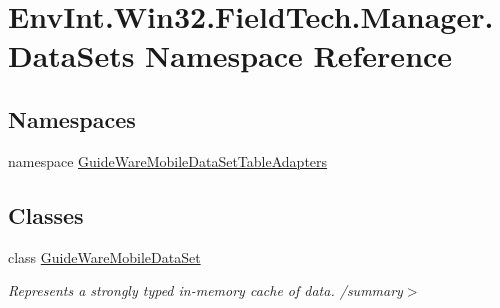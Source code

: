 \hypertarget{namespace_env_int_1_1_win32_1_1_field_tech_1_1_manager_1_1_data_sets}{}\section{Env\+Int.\+Win32.\+Field\+Tech.\+Manager.\+Data\+Sets Namespace Reference}
\label{namespace_env_int_1_1_win32_1_1_field_tech_1_1_manager_1_1_data_sets}
\subsection*{Namespaces}
\begin{DoxyCompactItemize}
\item 
namespace \hyperlink{namespace_env_int_1_1_win32_1_1_field_tech_1_1_manager_1_1_data_sets_1_1_guide_ware_mobile_data_set_table_adapters}{Guide\+Ware\+Mobile\+Data\+Set\+Table\+Adapters}
\end{DoxyCompactItemize}
\subsection*{Classes}
\begin{DoxyCompactItemize}
\item 
class \hyperlink{class_env_int_1_1_win32_1_1_field_tech_1_1_manager_1_1_data_sets_1_1_guide_ware_mobile_data_set}{Guide\+Ware\+Mobile\+Data\+Set}
\begin{DoxyCompactList}\small\item\em Represents a strongly typed in-\/memory cache of data. /summary$>$ \end{DoxyCompactList}\end{DoxyCompactItemize}
